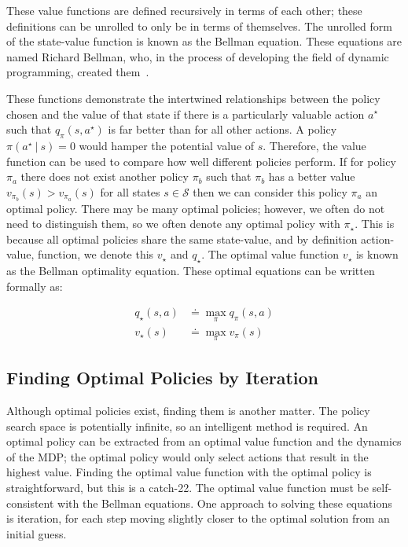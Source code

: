 \documentclass[]{final_report}
\begin{document}
These value functions are defined recursively in terms of each other; these definitions can be unrolled to only be in terms of themselves. The unrolled form of the state-value function is known as the Bellman equation. These equations are named Richard Bellman, who, in the process of developing the field of dynamic programming, created them~\cite{bellman1957}.   

These functions demonstrate the intertwined relationships between the policy chosen and the value of that state if there is a particularly valuable action $a^\star$ such that $q_\pi(s,a^\star)$ is far better than for all other actions. A policy $\pi(a^\star\ |\ s) = 0$ would hamper the potential value of $s$. Therefore, the value function can be used to compare how well different policies perform. If for policy $\pi_a$ there does not exist another policy $\pi_b$ such that $\pi_b$ has a better value $v_{\pi_b}(s) > v_{\pi_a}(s)$ for all states $s \in \mathcal{S}$ then we can consider this policy $\pi_a$ an optimal policy. There may be many optimal policies; however, we often do not need to distinguish them, so we often denote any optimal policy with $\pi_\star$. This is because all optimal policies share the same state-value, and by definition action-value, function, we denote this $ v_\star$ and $q_\star$. The optimal value function $v_\star$ is known as the Bellman optimality equation. These optimal equations can be written formally as:


\begin{align}
  q_\star(s,a) & \doteq \max_\pi q_\pi(s,a)\label{eqn:q-optimal-def} \\
  v_\star(s)   & \doteq \max_\pi v_\pi(s) \label{eqn:v-optimal-def}
\end{align}




\subsection{Finding Optimal Policies by Iteration}\label{iteration-approaches}

Although optimal policies exist, finding them is another matter. The policy search space is potentially infinite, so an intelligent method is required. An optimal policy can be extracted from an optimal value function and the dynamics of the MDP; the optimal policy would only select actions that result in the highest value. Finding the optimal value function with the optimal policy is straightforward, but this is a catch-22. The optimal value function must be self-consistent with the Bellman equations. One approach to solving these equations is iteration, for each step moving slightly closer to the optimal solution from an initial guess. 
\end{document}

